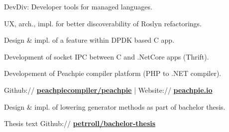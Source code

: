 \documentclass[a4paper]{deedy-resume} %
\begin{document}
\begin{minipage}[t]{0.62\textwidth}
\halfsectionspace %



\begin{tightitemize}
\item DevDiv: Developer tools for managed languages.
\item UX, arch., impl. for better discoverability of Roslyn refactorings.
\end{tightitemize}

\begin{tightitemize}
\item Design \& impl. of a feature within DPDK based C app.
\item Development of socket IPC between C and .NetCore apps (Thrift).
\end{tightitemize}

\halfsectionspace %



\begin{tightitemize}
\item Developement of Peachpie compiler platform (PHP to .NET compiler).
\item Github:// \href{https://github.com/peachpiecompiler/peachpie}{\bf peachpiecompiler/peachpie} | Website:// \href{https://www.peachpie.io/}{\bf peachpie.io}
\item Design \& impl. of lowering generator methods as part of bachelor thesis.
\item Thesis text Github:// \href{https://github.com/petrroll/bachelor-thesis}{\bf petrroll/bachelor-thesis}
\end{tightitemize}

\sectionspace %


%
%


\end{minipage}
\end{document}
